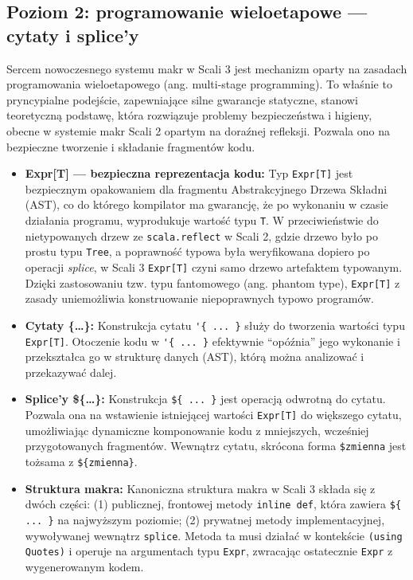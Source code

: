 \subsection{Poziom 2: programowanie wieloetapowe — cytaty i splice'y}
Sercem nowoczesnego systemu makr w Scali 3 jest mechanizm oparty na zasadach programowania wieloetapowego (ang. multi-stage programming).
To właśnie to pryncypialne podejście, zapewniające silne gwarancje statyczne, stanowi teoretyczną podstawę, która rozwiązuje problemy bezpieczeństwa i higieny, obecne w systemie makr Scali 2 opartym na doraźnej refleksji.
Pozwala ono na bezpieczne tworzenie i składanie fragmentów kodu.
\begin{itemize}
    \item \textbf{Expr[T] — bezpieczna reprezentacja kodu:}
    Typ \verb|Expr[T]| jest bezpiecznym opakowaniem dla fragmentu Abstrakcyjnego Drzewa Składni (AST), co do którego kompilator ma gwarancję, że po wykonaniu w czasie działania programu, wyprodukuje wartość typu \verb|T|.
    W przeciwieństwie do nietypowanych drzew ze \verb|scala.reflect| w Scali 2, gdzie drzewo było po prostu typu \verb|Tree|, a poprawność typowa była weryfikowana dopiero po operacji \emph{splice}, w Scali 3 \verb|Expr[T]| czyni samo drzewo artefaktem typowanym.
    Dzięki zastosowaniu tzw. typu fantomowego (ang. phantom type), \verb|Expr[T]| z zasady uniemożliwia konstruowanie niepoprawnych typowo programów.
    \item \textbf{Cytaty \{\dots\}:}
    Konstrukcja cytatu \verb|'{ ... }| służy do tworzenia wartości typu \verb|Expr[T]|.
    Otoczenie kodu w \verb|'{ ... }| efektywnie \enquote{opóźnia} jego wykonanie i przekształca go w strukturę danych (AST), którą można analizować i przekazywać dalej.
    \item \textbf{Splice'y \$\{\dots\}:}
    Konstrukcja \verb|${ ... }| jest operacją odwrotną do cytatu.
    Pozwala ona na wstawienie istniejącej wartości \verb|Expr[T]| do większego cytatu, umożliwiając dynamiczne komponowanie kodu z mniejszych, wcześniej przygotowanych fragmentów.
    Wewnątrz cytatu, skrócona forma \verb|$zmienna| jest tożsama z \verb|${zmienna}|.
    \item \textbf{Struktura makra:}
    Kanoniczna struktura makra w Scali 3 składa się z dwóch części: (1) publicznej, frontowej metody \verb|inline def|, która zawiera \verb|${ ... }| na najwyższym poziomie; (2) prywatnej metody implementacyjnej, wywoływanej wewnątrz \verb|splice|.
    Metoda ta musi działać w kontekście \verb|(using Quotes)| i operuje na argumentach typu \verb|Expr|, zwracając ostatecznie \verb|Expr| z wygenerowanym kodem.
\end{itemize}

